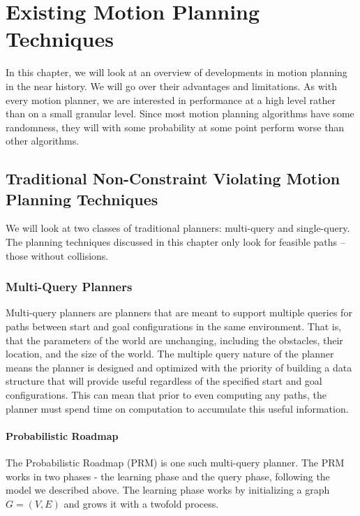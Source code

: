 \chapter{Existing Motion Planning Techniques}
In this chapter, we will look at an overview of developments in motion planning in the near history. We will go over their advantages and limitations. As with every motion planner, we are interested in performance at a high level rather than on a small granular level. Since most motion planning algorithms have some randomness, they will with some probability at some point perform worse than other algorithms. 

\section{Traditional Non-Constraint Violating Motion Planning Techniques} \label{planning:techniques}
We will look at two classes of traditional planners: multi-query and single-query. The planning techniques discussed in this chapter only look for feasible paths -- those without collisions.

\subsection{Multi-Query Planners}
Multi-query planners are planners that are meant to support multiple queries for paths between start and goal configurations in the same environment. That is, that the parameters of the world are unchanging, including the obstacles, their location, and the size of the world. The multiple query nature of the planner means the planner is designed and optimized with the priority of building a data structure that will provide useful regardless of the specified start and goal configurations. This can mean that prior to even computing any paths, the planner must spend time on computation to accumulate this useful information.

\subsubsection{Probabilistic Roadmap}
The Probabilistic Roadmap (PRM) is one such multi-query planner. The PRM works in two phases - the learning phase and the query phase, following the model we described above. The learning phase works by initializing a graph $G=(V,E)$ and grows it with a twofold process. 

